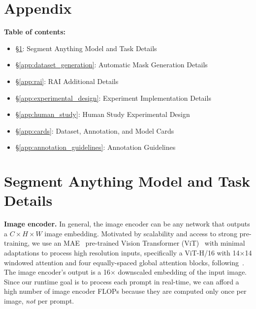 \documentclass[10pt,twocolumn,letterpaper]{article}
\renewcommand{\paragraph}[1]{\vspace{1.25mm}\noindent\textbf{#1}}
\newcommand{\x}{{\times}}
\begin{document}
{\footnotesize\linespread{.975}\selectfont}

\appendix
\section*{Appendix}
\label{appendix}
\paragraph{Table of contents:}
\begin{itemize}[itemsep=-1pt,topsep=-1pt]
\item \S\ref{app:model}: Segment Anything Model and Task Details
\item \S\ref{app:dataset_generation}: Automatic Mask Generation Details
\item \S\ref{app:rai}: RAI Additional Details
\item \S\ref{app:experimental_design}: Experiment Implementation Details
\item \S\ref{app:human_study}: Human Study Experimental Design
\item \S\ref{app:cards}: Dataset, Annotation, and Model Cards
\item \S\ref{app:annotation_guidelines}: Annotation Guidelines
\end{itemize}

\section{Segment Anything Model and Task Details}\label{app:model}

\paragraph{Image encoder.} In general, the image encoder can be any network that outputs a $C \x H \x W$ image embedding. Motivated by scalability and access to strong pre-training, we use an MAE~\cite{he2022masked} pre-trained Vision Transformer (ViT)~\cite{Dosovitskiy2021} with minimal adaptations to process high resolution inputs, specifically a ViT-H/16 with 14$\x$14 windowed attention and four equally-spaced global attention blocks, following~\cite{li2022exploring}. The image encoder's output is a 16$\x$ downscaled embedding of the input image. Since our runtime goal is to process each prompt in real-time, we can afford a high number of image encoder FLOPs because they are computed only once per image, \emph{not} per prompt.
\end{document}

